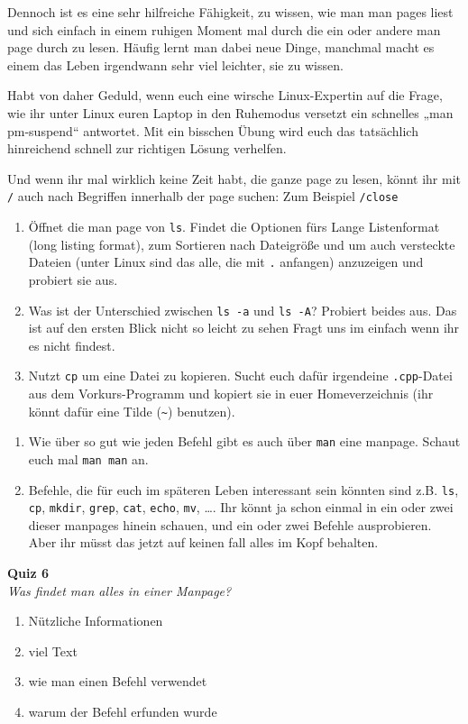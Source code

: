 Dennoch ist es eine sehr hilfreiche Fähigkeit, zu wissen, wie man man pages
liest und sich einfach in einem ruhigen Moment mal durch die ein oder andere
man page durch zu lesen. Häufig lernt man dabei neue Dinge, manchmal macht es
einem das Leben irgendwann sehr viel leichter, sie zu wissen.

Habt von daher Geduld, wenn euch eine wirsche Linux-Expertin auf die Frage, wie
ihr unter Linux euren Laptop in den Ruhemodus versetzt ein schnelles „man
pm-suspend“ antwortet. Mit ein bisschen Übung wird euch das tatsächlich
hinreichend schnell zur richtigen Lösung verhelfen.


Und wenn ihr mal wirklich keine Zeit habt, die ganze page zu lesen, könnt ihr mit \texttt{/} auch nach Begriffen innerhalb der page suchen: Zum Beispiel \texttt{/close}

\begin{praxis}
	\begin{enumerate}\addtocounter{enumi}{1}
		\item Öffnet die man page von \texttt{ls}. Findet die Optionen fürs Lange
		      Listenformat (long listing format), zum Sortieren nach Dateigröße
		      und um auch versteckte Dateien (unter Linux sind das alle, die mit
		      \texttt{.} anfangen) anzuzeigen und probiert sie aus.
		\item Was ist der Unterschied zwischen \texttt{ls -a} und \texttt{ls -A}?
		      Probiert beides aus. Das ist auf den ersten Blick nicht so leicht zu sehen
		      Fragt uns im einfach wenn ihr es nicht findest.
		\item Nutzt \texttt{cp} um eine Datei zu kopieren. Sucht euch dafür
		      irgendeine \texttt{.cpp}-Datei aus dem Vorkurs-Programm und kopiert sie
		      in euer Homeverzeichnis (ihr könnt dafür eine Tilde (\texttt{\~})
		      benutzen).
	\end{enumerate}
\end{praxis}

\begin{spiel}
	\begin{enumerate}
		\item Wie über so gut wie jeden Befehl gibt es auch über \texttt{man} eine
		      manpage. Schaut euch mal \texttt{man man} an.
		\item Befehle, die für euch im späteren Leben interessant sein könnten sind
		      z.B. \texttt{ls}, \texttt{cp}, \texttt{mkdir}, \texttt{grep}, \texttt{cat},
		      \texttt{echo}, \texttt{mv}, \dots. Ihr könnt ja schon einmal in ein
		      oder zwei dieser manpages hinein schauen, und ein oder zwei Befehle
		      ausprobieren. Aber ihr müsst das jetzt auf keinen fall alles im Kopf
		      behalten.
	\end{enumerate}
\end{spiel}

\textbf{Quiz 6}\\
\textit{Was findet man alles in einer Manpage?}
\begin{enumerate}[label=\alph*)]
	\item Nützliche Informationen
	\item viel Text
	\item wie man einen Befehl verwendet
	\item warum der Befehl erfunden wurde
\end{enumerate}

